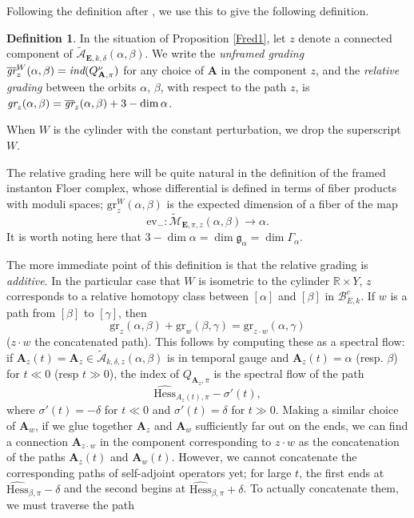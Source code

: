 \documentclass{memo-l}
\theoremstyle{definition}
\newtheorem{definition}[theorem]{Definition}
\theoremstyle{remark}
\numberwithin{section}{chapter}
\numberwithin{equation}{chapter}
\begin{document}
Following the definition after \cite[Lemma~3.13]{KM1}, we use this to give the following definition.

\begin{definition}\label{grading}In the situation of Proposition \ref{Fred1}, let $z$ denote 
a connected component of $\widetilde{\mathcal A}_{\mathbf{E},k, \delta}(\alpha, \beta)$. We write the \textit{unframed grading} $\overline{\text{\em{gr}}}^W_z(\alpha, \beta) = \text{\em{ind}}(Q^\nu_{\mathbf{A},\pi})$ for any choice of $\mathbf{A}$ in the component $z$, and the \textit{relative grading} between the orbits $\alpha$, $\beta$, with respect to the path $z$, is $\text{\em{gr}}_z(\alpha, \beta) = \overline{\text{\em{gr}}}_z(\alpha, \beta) + 3 - \dim \alpha$.

When $W$ is the cylinder with the constant perturbation, we drop the superscript $W$.
\end{definition}

The relative grading here will be quite natural in the definition of the framed instanton Floer complex, whose differential is defined in terms of fiber products with moduli spaces; $\text{gr}^W_z(\alpha, \beta)$ is the expected dimension of a fiber of the map $$\text{ev}_-: \widetilde{\mathcal M}_{\mathbf{E},\pi,z}(\alpha, \beta) \to \alpha.$$ It is worth noting here that $3 - \dim \alpha = \dim \mathfrak g_{\alpha} = \dim \Gamma_{\alpha}$.

The more immediate point of this definition is that the relative grading is \textit{additive}. In the particular case that $W$ is isometric to the cylinder $\mathbb R \times Y$, $z$ corresponds to a relative homotopy class between $[\alpha]$ and $[\beta]$ in $\mathcal B^e_{E,k}$. If $w$ is a path from $[\beta]$ to $[\gamma]$, then $$\text{gr}_z(\alpha, \beta) + \text{gr}_w(\beta, \gamma) = \text{gr}_{z \cdot w}(\alpha, \gamma)$$ ($z \cdot w$ the concatenated path). This follows by computing these as a spectral flow: if $\mathbf{A}_z(t) = \mathbf{A}_z \in \widetilde{\mathcal A}_{k, \delta,z}(\alpha, \beta)$ is in temporal gauge and $\mathbf{A}_z(t) = \alpha$ (resp. $\beta$) for $t \ll 0$ (resp $t \gg 0$), the index of $Q_{\mathbf{A}_z,\pi}$ is the spectral flow of the path
$$\widehat{\text{Hess}}_{A_z(t),\pi} - \sigma'(t),$$ 
where $\sigma'(t) = - \delta$ for $t \ll 0$ and $\sigma'(t) = \delta$ for $t \gg 0$. Making a similar choice of $\mathbf{A}_w$, if we glue together $\mathbf{A}_z$ and $\mathbf{A}_w$ sufficiently far out on the ends, we can find a connection $\mathbf{A}_{z \cdot w}$ in the component corresponding to $z \cdot w$ as the concatenation of the paths $\mathbf{A}_z(t)$ and $\mathbf{A}_w(t)$. However, we cannot concatenate the corresponding paths of self-adjoint operators yet; for large $t$, the first ends at $\widehat{\text{Hess}}_{\beta,\pi} - \delta$ and the second begins at $\widehat{\text{Hess}}_{\beta,\pi} + \delta$. To actually concatenate them, we must traverse the path
\end{document}
